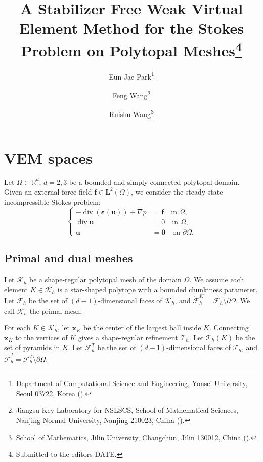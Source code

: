 \documentclass[review,hidelinks,onefignum,onetabnum]{siamart251216}
\title{A Stabilizer Free Weak Virtual Element Method for the
Stokes Problem on Polytopal Meshes\thanks{Submitted to the editors DATE.
\funding{The first author was supported by ...}}}
\author{Eun-Jae Park\thanks{Department of Computational Science and Engineering, 
           Yonsei University, 
           Seoul 03722, Korea
  (\email{ejpark@yonsei.ac.kr}).}
\and Feng Wang\thanks{Jiangsu Key Laboratory for NSLSCS, 
School of Mathematical Sciences, Nanjing Normal University,
Nanjing 210023, China  
  (\email{fengwang@live.cn}).}
\and Ruishu Wang\thanks{School of Mathematics,
Jilin University, 
Changchun, Jilin 130012, China
  (\email{wangrs\_math@jlu.edu.cn}).}
}
\begin{document}
%
%


\section{VEM spaces}

Let \(\Omega \subset \mathbb{R}^d\), \(d = 2, 3\) be a bounded and simply connected polytopal domain. Given an
external force field \(\boldsymbol{f} \in \boldsymbol{L}^2(\Omega)\), we consider the steady-state incompressible Stokes problem:
\begin{equation}
\left\{
\begin{aligned}
-\operatorname{div}(\boldsymbol{\varepsilon}(\boldsymbol{u})) + \nabla p &= \boldsymbol{f} \quad \text{in } \Omega, \\
\operatorname{div} \boldsymbol{u} &= 0 \quad \text{in } \Omega, \\
\boldsymbol{u} &= \boldsymbol{0} \quad \text{on } \partial\Omega.
\end{aligned}
\right.
\end{equation}


\subsection{Primal and dual meshes}
Let $\mathcal{K}_h$ be a shape-regular polytopal mesh of the domain $\Omega$. We assume each element $K\in\mathcal{K}_h$ is a star-shaped polytope with a bounded chunkiness parameter. Let $\mathcal{F}_h$ be the set of $(d-1)$-dimensional faces of $\mathcal{K}_h$, and $\mathring{\mathcal{F}}_h^{K}=\mathcal{F}_h \setminus \partial \Omega$. We call $\mathcal{K}_h$ the primal mesh.


For each $K\in\mathcal{K}_h$, let $\boldsymbol{x}_K$ be the center of the largest ball inside $K$. Connecting $\boldsymbol{x}_K$ to the vertices of $K$ gives a shape-regular refinement $\mathcal{T}_h$. Let $\mathcal{T}_h(K)$ be the set of pyramids in $K$. Let $\mathcal{F}_h^T$ be the set of $(d-1)$-dimensional faces of $\mathcal{T}_h$, and $\mathring{\mathcal{F}}_h^{T}=\mathcal{F}_h^T \setminus \partial \Omega$.
\end{document}
